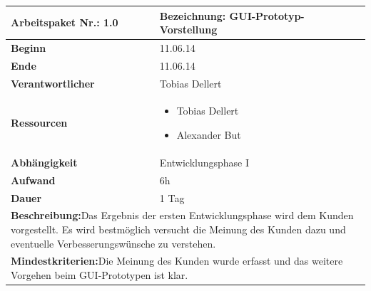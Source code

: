 \documentclass[fontsize=12pt,paper=a4,twoside]{scrartcl}
\begin{document}
\begin{verbatim} 

\end{verbatim}
\begin{tabular}{|p{5.3cm}|p{9.7cm}|}\hline
	\textbf{Arbeitspaket Nr.:} 1.0 & \textbf{Bezeichnung:} GUI-Prototyp-Vorstellung\\ \hline \hline
	\textbf{Beginn} & 11.06.14\\ \hline
	\textbf{Ende} &11.06.14\\ \hline
	\textbf{Verantwortlicher} & Tobias Dellert\\ \hline
	\textbf{Ressourcen} & \begin{itemize}
		\item Tobias Dellert
		\item Alexander But
	\end{itemize}    \\ \hline
	\textbf{Abhängigkeit} & Entwicklungsphase I\\ \hline
	\textbf{Aufwand} & 6h\\ \hline
	\textbf{Dauer} & 1 Tag\\ \hline
	\multicolumn{2}{|p{15cm}|}{\textbf{Beschreibung:}\newline  Das Ergebnis der ersten Entwicklungsphase wird dem Kunden vorgestellt. Es wird bestmöglich versucht die Meinung des Kunden dazu und eventuelle Verbesserungswünsche zu verstehen. }\\ \hline
	\multicolumn{2}{|p{15cm}|}{\textbf{Mindestkriterien:}\newline Die Meinung des Kunden wurde erfasst und das weitere Vorgehen beim GUI-Prototypen ist klar.}\\ \hline
	
\end{tabular}
\begin{verbatim} 

\end{verbatim}
\end{document}
